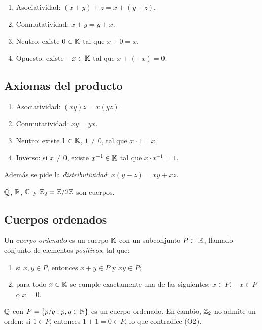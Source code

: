 \begin{enumerate}[label=(S\arabic*)]
  \item Asociatividad: \((x + y) + z = x + (y + z)\).
  \item Conmutatividad: \(x + y = y + x\).
  \item Neutro: existe \(0 \in \mathbb{K}\) tal que \(x + 0 = x\).
  \item Opuesto: existe \(-x \in \mathbb{K}\) tal que \(x + (-x) = 0\).
\end{enumerate}

\subsection{Axiomas del producto}

\begin{enumerate}[label=(P\arabic*)]
  \item Asociatividad: \((xy)z = x(yz)\).
  \item Conmutatividad: \(xy = yx\).
  \item Neutro: existe \(1 \in \mathbb{K}\), \(1 \neq 0\), tal que \(x \cdot 1 = x\).
  \item Inverso: si \(x \neq 0\), existe \(x^{-1} \in \mathbb{K}\) tal que \(x \cdot x^{-1} = 1\).
\end{enumerate}

Además se pide la \emph{distributividad}: \(x(y + z) = xy + xz\).

\begin{eg}
  \(\mathbb{Q}\), \(\mathbb{R}\), \(\mathbb{C}\) y \(\mathbb{Z}_2 = \mathbb{Z}/2\mathbb{Z}\) son cuerpos.
\end{eg}

\subsection{Cuerpos ordenados}

Un \emph{cuerpo ordenado} es un cuerpo \(\mathbb{K}\) con un subconjunto \(P \subset \mathbb{K}\), llamado conjunto de elementos \emph{positivos}, tal que:
\begin{enumerate}[label=(O\arabic*)]
  \item si \(x, y \in P\), entonces \(x + y \in P\) y \(xy \in P\);
  \item para todo \(x \in \mathbb{K}\) se cumple exactamente una de las siguientes: \(x \in P\), \(-x \in P\) o \(x = 0\).
\end{enumerate}

\begin{eg}
  \(\mathbb{Q}\) con \(P = \{ p/q : p, q \in \mathbb{N} \}\) es un cuerpo ordenado. En cambio, \(\mathbb{Z}_2\) no admite un orden: si \(1 \in P\), entonces \(1 + 1 = 0 \in P\), lo que contradice (O2).
\end{eg}

